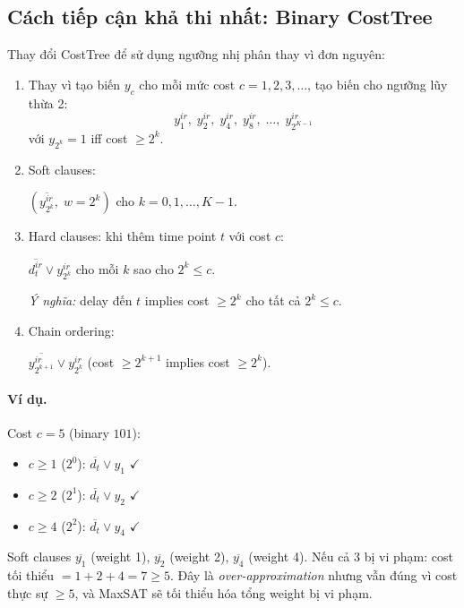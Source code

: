 \documentclass[11pt,a4paper]{article}
\begin{document}
\subsection{Cách tiếp cận khả thi nhất: Binary CostTree}

Thay đổi CostTree để sử dụng ngưỡng nhị phân thay vì đơn nguyên:

\begin{enumerate}
  \item Thay vì tạo biến $y_c$ cho mỗi mức cost $c = 1, 2, 3, \ldots$, tạo biến cho ngưỡng lũy thừa 2:
  \[
  y_1^{ir},\; y_2^{ir},\; y_4^{ir},\; y_8^{ir},\; \ldots,\; y_{2^{K-1}}^{ir}
  \]
  với $y_{2^k} = 1$ iff cost $\geq 2^k$.

  \item Soft clauses:
  \begin{softbox}
  $(\overline{y_{2^k}^{ir}}, \; w = 2^k)$ \quad cho $k = 0, 1, \ldots, K-1$.
  \end{softbox}

  \item Hard clauses: khi thêm time point $t$ với cost $c$:
  \begin{hardbox}
  $\overline{d_t^{ir}} \vee y_{2^k}^{ir}$ \quad cho mỗi $k$ sao cho $2^k \leq c$.
  \end{hardbox}
  \emph{Ý nghĩa:} delay đến $t$ implies cost $\geq 2^k$ cho tất cả $2^k \leq c$.

  \item Chain ordering:
  \begin{hardbox}
  $\overline{y_{2^{k+1}}^{ir}} \vee y_{2^k}^{ir}$ \quad (cost $\geq 2^{k+1}$ implies cost $\geq 2^k$).
  \end{hardbox}
\end{enumerate}

\paragraph{Ví dụ.} Cost $c = 5$ (binary $101$):
\begin{itemize}
  \item $c \geq 1$ ($2^0$): $\overline{d_t} \vee y_1$ $\checkmark$
  \item $c \geq 2$ ($2^1$): $\overline{d_t} \vee y_2$ $\checkmark$
  \item $c \geq 4$ ($2^2$): $\overline{d_t} \vee y_4$ $\checkmark$
\end{itemize}
Soft clauses $\overline{y_1}$ (weight 1), $\overline{y_2}$ (weight 2), $\overline{y_4}$ (weight 4). Nếu cả 3 bị vi phạm: cost tối thiểu $= 1 + 2 + 4 = 7 \geq 5$. Đây là \emph{over-approximation} nhưng vẫn đúng vì cost thực sự $\geq 5$, và MaxSAT sẽ tối thiểu hóa tổng weight bị vi phạm.
\end{document}
